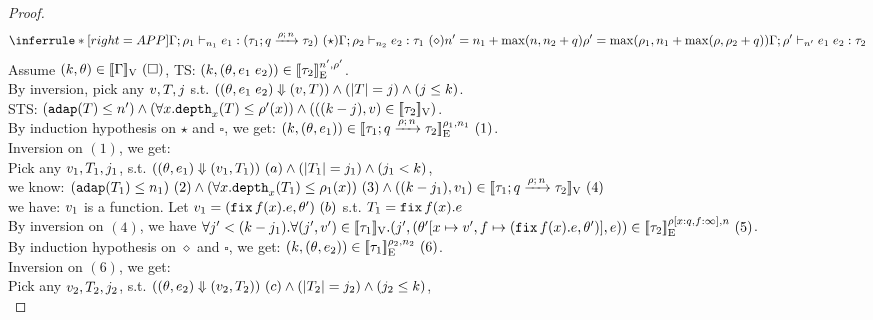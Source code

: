 \documentclass[a4paper,11pt]{article}
\theoremstyle{definition}
\begin{document}
\begin{proof}
\[
    \inferrule*[right = APP]
    {
      \Gamma; \dmap_1 \tvdash{\nnatA_1} \expr_1: (\tarr{\type_1}{\type_2}{\nnatbiA}{\dmap}{\nnatA})~(\star) \\
      \Gamma; \dmap_2 \tvdash{\nnatA_2} \expr_2: \type_1 ~(\diamond)\\\\
      \nnatA' = \nnatA_1 + \max(\nnatA, \nnatA_2 + \nnatbiA) \\
      \dmap' = \max(\dmap_1, \nnatA_1 + \max(\dmap, \dmap_2 + \nnatbiA))
    }{
      \Gamma; \dmap' \tvdash{\nnatA'} \expr_1 \eapp \expr_2 : \type_2
    }
\]
%
Assume $(\stepiA, \env) \in \lrv{\Gamma} ~ (\square)$, TS: $(\stepiA, (\env, \expr_1 \eapp \expr_2)) \in \lre{\nnatA'}{\dmap'}{\type_2}$.\\
%
By inversion, pick any $\valr, \tr, j$ s.t. $((\env, \expr_1 \eapp \expr_2) \bigstep (\valr, \tr)) \land (\size{\tr} = j) \land (j \leq \stepiA) $.\\
%
STS: $(\adap(\tr) \leq \nnatA') \land (\forall x. \ddep{x}(\tr) \leq \dmap'(x)) \land (((\stepiA - j), \valr) \in \lrv{\type_2})$.\\
%
By induction hypothesis on $\star$ and $\square$, we get: $(\stepiA, (\env, \expr_1)) \in \lre{\dmap_1}{\nnatA_1}{\tarr{\type_1}{\type_2}{\nnatbiA}{\dmap}{\nnatA}} ~(1) $.\\
%
Inversion on $(1)$, we get:\\
%
Pick any $\valr_1, \tr_1, j_1$, s.t. $((\env, \expr_1) \bigstep (\valr_1, \tr_1)) ~(a) \land (\size{\tr_1} = j_1) \land (j_1 < \stepiA)$, \\
%
we know: $(\adap(\tr_1) \leq \nnatA_1)~(2) \land (\forall x. \ddep{x}(\tr_1) \leq \dmap_1(x))~(3) \land ((\stepiA - j_1), \valr_1) \in \lrv{\tarr{\type_1}{\type_2}{\nnatbiA}{\dmap}{\nnatA}} ~ (4)$\\
%
we have: $\valr_1$ is a function.
%
Let $\valr_1 = (\efix f(x). \expr, \env') ~(b)$ s.t. $\tr_1= \efix f(x). \expr$\\
By inversion on $(4)$, we have $\forall j' < (\stepiA - j_1). \forall (j', \valr') \in \lrv{\type_1}. (j', (\env'[x \mapsto \valr', f \mapsto (\efix f(x).\expr, \env')], \expr)) \in \lre{\dmap[x : \nnatbiA, f: \infty]}{\nnatA}{\type_2} ~ (5)$.\\ 
%
By induction hypothesis on $\diamond$ and $\square$, we get:
%
$(\stepiA, (\env, \expr_2)) \in \lre{\dmap_2}{\nnatA_2}{\type_1} ~(6)$.\\
%
Inversion on $(6)$, we get:\\
%
Pick any $\valr_2, \tr_2, j_2$, s.t. $((\env, \expr_2) \bigstep (\valr_2, \tr_2))~(c) \land (\size{\tr_2} = j_2) \land (j_2 \leq \stepiA)$,\\

\end{proof}
\end{document}
